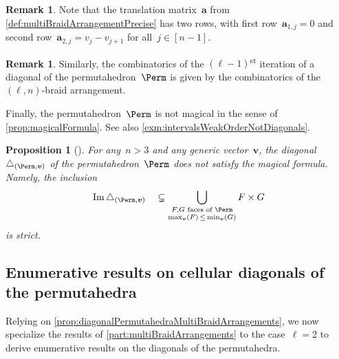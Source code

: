 \documentclass{amsart}
\newtheorem{proposition}[theorem]{Proposition}
\theoremstyle{definition}
\newtheorem{remark}[theorem]{Remark}
\renewcommand{\b}[1]{{\boldsymbol{#1}}} %
\DeclareMathOperator{\Ima}{Im} %
\newcommand{\ordinalst}{\textsuperscript{st}} %
\renewcommand{\b}[1]{\boldsymbol{#1}} %
\begin{document}
\begin{remark}
\label{rem:translationMatrix}
Note that the translation matrix~$\b{a}$ from \cref{def:multiBraidArrangementPrecise} has two rows, with first row~$\b{a}_{1,j} = 0$ and second row~$\b{a}_{2,j} = v_j-v_{j+1}$ for all~$j \in [n-1]$.
\end{remark}

\begin{remark}
Similarly, the combinatorics of the $(\ell-1)$\ordinalst{} iteration of a diagonal of the permutahedron~$\Perm$ is given by the combinatorics of the $(\ell,n)$-braid arrangement.
\end{remark}

Finally, the permutahedron~$\Perm$ is not magical in the sense of \cref{prop:magicalFormula}.
See also \cref{exm:intervalsWeakOrderNotDiagonals}.

\begin{proposition}[{\cite[Sect.~3]{LaplanteAnfossi}}]
For any~$n > 3$ and any generic vector~$\b{v}$, the diagonal~$\triangle_{(\Perm, \b{v})}$ of the permutahedron~$\Perm$ does \emph{not} satisfy the magical formula.
Namely, the inclusion	  
\begin{equation*}
\Ima\triangle_{(\Perm, \b{v})} \quad \subsetneq \bigcup_{\substack{F,G \text{ faces of } \Perm \\ \max_{\b{v}}(F) \, \le \, \min_{\b{v}}(G)}} F \times G  
\end{equation*}
is strict.
\end{proposition}


\subsection{Enumerative results on cellular diagonals of the permutahedra} 
\label{subsec:enumerationDiagonalPermutahedra}

Relying on \cref{prop:diagonalPermutahedraMultiBraidArrangements}, we now specialize the results of \cref{part:multiBraidArrangements} to the case~$\ell = 2$ to derive enumerative results on the diagonals of the permutahedra.
\end{document}
